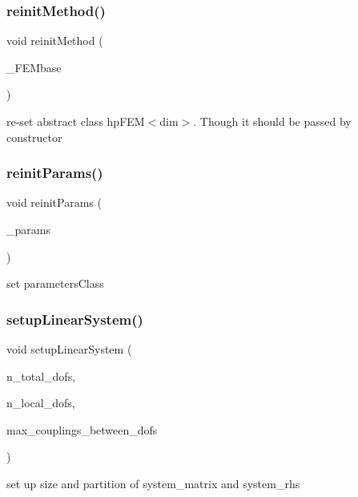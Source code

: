 \subsubsection{\texorpdfstring{reinit\+Method()}{reinitMethod()}}
{\footnotesize\ttfamily void reinit\+Method (\begin{DoxyParamCaption}\item[{\mbox{\hyperlink{classhp_f_e_m}{hp\+F\+EM}}$<$ dim $>$ \&}]{\+\_\+\+F\+E\+Mbase }\end{DoxyParamCaption})}

re-\/set abstract class hp\+F\+E\+M$<$dim$>$. Though it should be passed by constructor \mbox{\label{classsolve_class_aa4ad1317ebf556afc0f3ffeed490dbb4}} 
\subsubsection{\texorpdfstring{reinit\+Params()}{reinitParams()}}
{\footnotesize\ttfamily void reinit\+Params (\begin{DoxyParamCaption}\item[{dealii\+::\+Parameter\+Handler \&}]{\+\_\+params }\end{DoxyParamCaption})}

set parameters\+Class \mbox{\label{classsolve_class_abcdd7b865378898804f4831f0a078e04}} 
\subsubsection{\texorpdfstring{setup\+Linear\+System()}{setupLinearSystem()}}
{\footnotesize\ttfamily void setup\+Linear\+System (\begin{DoxyParamCaption}\item[{int}]{n\+\_\+total\+\_\+dofs,  }\item[{int}]{n\+\_\+local\+\_\+dofs,  }\item[{int}]{max\+\_\+couplings\+\_\+between\+\_\+dofs }\end{DoxyParamCaption})}

set up size and partition of system\+\_\+matrix and system\+\_\+rhs \mbox{\label{classsolve_class_a922f231ca16d84f2d3253c0d497f2448}} 
